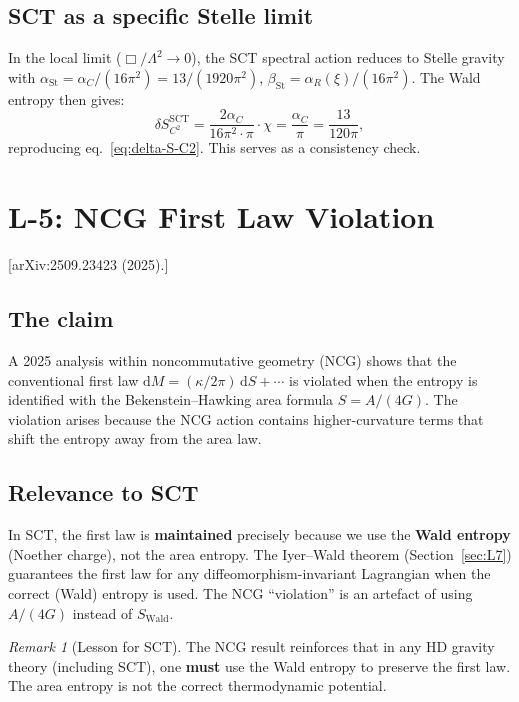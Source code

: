\documentclass[12pt,a4paper]{article}
\theoremstyle{definition}
\theoremstyle{remark}
\newtheorem{remark}[proposition]{Remark}
\newcommand{\dd}{\mathrm{d}}
\newcommand{\fromlit}[1]{\textcolor{blue!70!black}{\textsf{[#1]}}}
\begin{document}
\subsection{SCT as a specific Stelle limit}

In the local limit ($\Box/\Lambda^2 \to 0$), the SCT spectral
action reduces to Stelle gravity with
$\alpha_{\mathrm{St}} = \alpha_C/(16\pi^2) = 13/(1920\pi^2)$,
$\beta_{\mathrm{St}} = \alpha_R(\xi)/(16\pi^2)$.  The Wald
entropy then gives:
\begin{equation}
  \delta S_{C^2}^{\mathrm{SCT}} = \frac{2\alpha_C}{16\pi^2 \cdot \pi}
  \cdot \chi = \frac{\alpha_C}{\pi} = \frac{13}{120\pi},
\end{equation}
reproducing eq.~\eqref{eq:delta-S-C2}. This serves as a
consistency check.


\section{L-5: NCG First Law Violation}
\label{sec:L5}

\fromlit{arXiv:2509.23423 (2025).}

\subsection{The claim}

A 2025 analysis within noncommutative geometry (NCG) shows that the
conventional first law $\dd M = (\kappa/2\pi)\,\dd S + \cdots$ is
violated when the entropy is identified with the Bekenstein--Hawking
area formula $S = A/(4G)$.  The violation arises because the NCG
action contains higher-curvature terms that shift the entropy away
from the area law.

\subsection{Relevance to SCT}

In SCT, the first law is \textbf{maintained} precisely because we use
the \textbf{Wald entropy} (Noether charge), not the area entropy.
The Iyer--Wald theorem (Section~\ref{sec:L7}) guarantees the first
law for any diffeomorphism-invariant Lagrangian when the correct
(Wald) entropy is used.  The NCG ``violation'' is an artefact of
using $A/(4G)$ instead of $S_{\mathrm{Wald}}$.

\begin{remark}[Lesson for SCT]
The NCG result reinforces that in any HD gravity theory (including
SCT), one \textbf{must} use the Wald entropy to preserve the first
law.  The area entropy is not the correct thermodynamic potential.
\end{remark}
\end{document}
